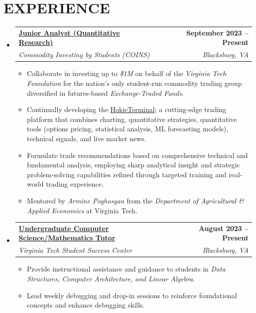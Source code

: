 \documentclass[letterpaper,10pt]{article}
\makeatletter
\newcommand{\resumeItem}[1]{
  \item{
    {#1 \vspace{-2.3pt}}
  }
}
\newcommand{\resumeSubheading}[4]{
  \vspace{-2pt}\item
    \begin{tabular*}{1\textwidth}[t]{l@{\extracolsep{\fill}}r}
      {#1} & #2 \\
      {#3} & \textit{#4} \\
    \end{tabular*}\vspace{-7pt}
}
\newcommand{\resumeSubHeadingListStart}{\begin{itemize}[leftmargin=0in, label={}]}
\newcommand{\resumeSubHeadingListEnd}{\end{itemize}}
\newcommand{\resumeItemListStart}{\begin{itemize}}
\newcommand{\resumeItemListEnd}{\end{itemize}\vspace{0pt}}
\makeatother
\begin{document}
\section{\bf EXPERIENCE}
  \resumeSubHeadingListStart
    \resumeSubheading
      {\textbf{\href{https://www.coins.aaec.vt.edu/}{Junior Analyst (Quantitative Research)}}}{\textbf{September 2023 -- Present}}
      {\textit{Commodity Investing by Students (COINS)}}{Blacksburg, VA}     \resumeItemListStart[leftmargin=0.2in]
        \resumeItem{Collaborate in investing up to \textit{\$1M} on behalf of the \textit{Virginia Tech Foundation} for the nation's only student-run commodity trading group diversified in futures-based \textit{Exchange-Traded Funds}.} \\
        \resumeItem{Continually developing the \href{https://hokieterminal.com/}{HokieTerminal}; a cutting-edge trading platform that combines charting, quantitative strategies, quantitative tools (options pricing, statistical analysis, ML forecasting models), technical signals, and live market news.}
        \resumeItem{Formulate trade recommendations based on comprehensive technical and fundamental analysis, employing sharp analytical insight and strategic problem-solving capabilities refined through targeted training and real-world trading experience.}
        \resumeItem{Mentored by \textit{Armine Poghosyan} from the \textit{Department of Agricultural \& Applied Economics} at Virginia Tech.}
      \resumeItemListEnd

      \resumeSubheading
      {\textbf{\href{https://studentsuccess.vt.edu/}{Undergraduate Computer Science/Mathematics Tutor}}}{\textbf{August 2023 -- Present}}
      {\textit{Virginia Tech Student Success Center}}{Blacksburg, VA}
      \resumeItemListStart[leftmargin=0.2in]
        \resumeItem{Provide instructional assistance and guidance to students in \textit{Data Structures, Computer Architecture, and Linear Algebra}.} \\
        \resumeItem{Lead weekly debugging and drop-in sessions to reinforce foundational concepts and enhance debugging skills.}
      \resumeItemListEnd
      
  \resumeSubHeadingListEnd
\end{document}
